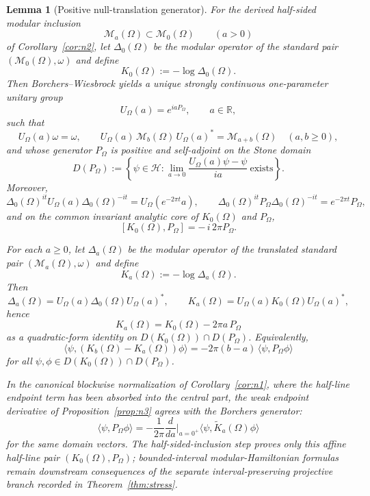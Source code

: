 \documentclass[11pt]{article}
\newtheorem{lemma}[theorem]{Lemma}
\begin{document}
\begin{lemma}[Positive null-translation generator]\label{lem:translation}
For the derived half-sided modular inclusion
\[
\mathcal M_a(\Omega)\subset \mathcal M_0(\Omega)
\qquad (a>0)
\]
of Corollary~\ref{cor:n2}, let \(\Delta_0(\Omega)\) be the modular operator of the standard pair \((\mathcal M_0(\Omega),\omega)\) and define
\[
K_0(\Omega):=-\log \Delta_0(\Omega).
\]
Then Borchers--Wiesbrock yields a unique strongly continuous one-parameter unitary group
\[
U_\Omega(a)=e^{iaP_\Omega},
\qquad a\in\mathbb R,
\]
such that
\[
U_\Omega(a)\omega=\omega,
\qquad
U_\Omega(a)\,\mathcal M_b(\Omega)\,U_\Omega(a)^*=\mathcal M_{a+b}(\Omega)
\quad (a,b\ge 0),
\]
and whose generator \(P_\Omega\) is positive and self-adjoint on the Stone domain
\[
D(P_\Omega)
:=
\left\{
\psi\in\mathcal H:
\lim_{a\to 0}\frac{U_\Omega(a)\psi-\psi}{ia}\ \text{exists}
\right\}.
\]
Moreover,
\[
\Delta_0(\Omega)^{it}U_\Omega(a)\Delta_0(\Omega)^{-it}
=
U_\Omega(e^{-2\pi t}a),
\qquad
\Delta_0(\Omega)^{it}P_\Omega\Delta_0(\Omega)^{-it}
=
e^{-2\pi t}P_\Omega,
\]
and on the common invariant analytic core of \(K_0(\Omega)\) and \(P_\Omega\),
\[
[K_0(\Omega),P_\Omega]=-\,i\,2\pi P_\Omega.
\]

For each \(a\ge 0\), let \(\Delta_a(\Omega)\) be the modular operator of the translated standard pair \((\mathcal M_a(\Omega),\omega)\) and define
\[
K_a(\Omega):=-\log \Delta_a(\Omega).
\]
Then
\[
\Delta_a(\Omega)=U_\Omega(a)\Delta_0(\Omega)U_\Omega(a)^*,
\qquad
K_a(\Omega)=U_\Omega(a)K_0(\Omega)U_\Omega(a)^*,
\]
hence
\[
K_a(\Omega)=K_0(\Omega)-2\pi a\,P_\Omega
\]
as a quadratic-form identity on \(D(K_0(\Omega))\cap D(P_\Omega)\). Equivalently,
\[
\langle\psi,(K_b(\Omega)-K_a(\Omega))\phi\rangle
=
-2\pi(b-a)\,\langle\psi,P_\Omega\phi\rangle
\]
for all \(\psi,\phi\in D(K_0(\Omega))\cap D(P_\Omega)\).

In the canonical blockwise normalization of Corollary~\ref{cor:n1}, where the half-line endpoint term has been absorbed into the central part, the weak endpoint derivative of Proposition~\ref{prop:n3} agrees with the Borchers generator:
\[
\langle\psi,P_\Omega\phi\rangle
=
-\frac{1}{2\pi}\frac{d}{da}\Big|_{a=0^+}
\langle\psi,\widetilde K_a(\Omega)\phi\rangle
\]
for the same domain vectors. The half-sided-inclusion step proves only this affine half-line pair \((K_0(\Omega),P_\Omega)\); bounded-interval modular-Hamiltonian formulas remain downstream consequences of the separate interval-preserving projective branch recorded in Theorem~\ref{thm:stress}.
\end{lemma}
\end{document}

